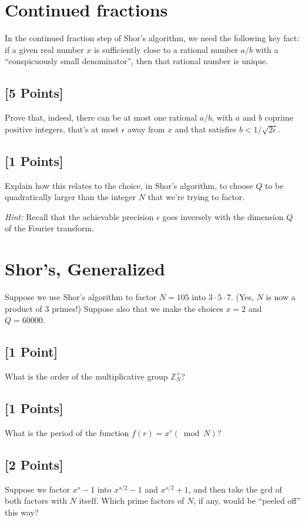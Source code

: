 \documentclass[11pt]{article}
\begin{document}
\section{Continued fractions} In the continued fraction step of Shor's algorithm, we need the following key fact: if a given real number $x$ is sufficiently close to a rational number $a/b$ with a ``conspicuously small denominator'', then that rational number is unique.  

\subsection{[5 Points]}
Prove that, indeed, there can be at most one rational $a/b$, with $a$ and $b$ coprime positive integers, that's at most $\epsilon$ away from $x$ and that satisfies $b < 1 / \sqrt{2 \epsilon}$.  



\subsection{[1 Points]}
Explain how this relates to the choice, in Shor's algorithm, to choose $Q$ to be quadratically larger than the integer $N$ that we're trying to factor. 

\noindent \emph{Hint:} Recall that the achievable precision $\epsilon$ goes inversely with the dimension $Q$ of the Fourier transform.




\section{Shor's, Generalized}
Suppose we use Shor's algorithm to factor $N=105$ into $3\cdot 5 \cdot 7$.  (Yes, $N$ is now a product of 3 primes!)  Suppose also that we make the choices $x=2$ and $Q=60000$.

\subsection{[1 Point]} What is the order of the multiplicative group $\mathbb{Z}_N^\times$?

\subsection{[1 Points]} What is the period of the function $f(r)=x^r (\bmod N)$?

\subsection{[2 Points]} Suppose we factor $x^s-1$ into $x^{s/2}-1$ and $x^{s/2}+1$, and then take the gcd of both factors with $N$ itself.  Which prime factors of $N$, if any, would be ``peeled off'' this way?
\end{document}
